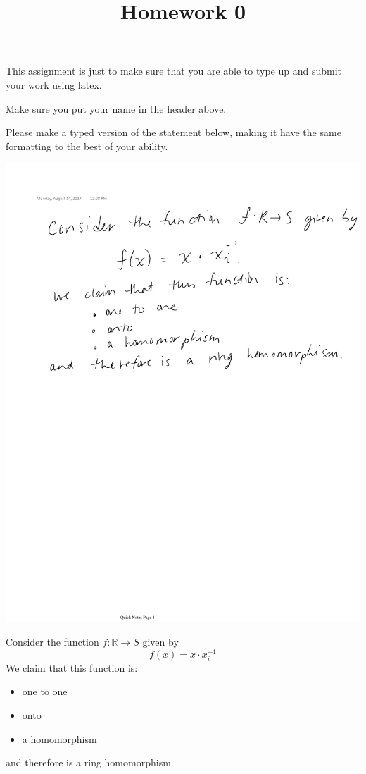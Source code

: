 \documentclass[12pt]{article}
\title{Homework 0}
\begin{document}
This assignment is just to make sure that you are able to type up and submit your work using latex.

Make sure you put your name in the header above.

Please make a typed version of the statement below, making it have the same formatting to the best of your ability.

\includegraphics[width=\textwidth]{hw0ex}

Consider the function \(f: \mathbb{R} \to S\) given by
\[ f(x) = x \cdot x_i^{-1}\]
We claim that this function is:
\begin{itemize}
\item one to one
\item onto
\item a homomorphism
\end{itemize}
and therefore is a ring homomorphism.
\end{document}
